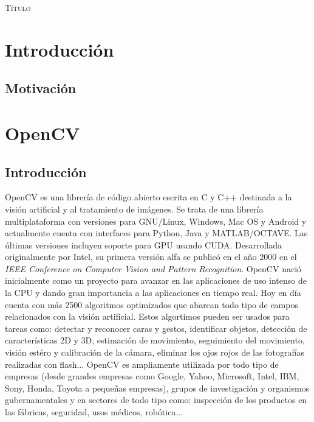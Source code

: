 \documentclass[a4paper,openright, 12pt]{book}
\begin{document}
\begin{titlepage}
\begin{center}
\begin{Huge}
\textsc{Título}
\end{Huge}
\end{center}
\end{titlepage}

\newpage
\mbox{}
\thispagestyle{empty} 


\tableofcontents %
\thispagestyle{empty}


\chapter{Introducción}\label{cap.introduccion}

\section{Motivación}
\chapter{OpenCV}

\section{Introducción}
OpenCV es una librería de código abierto escrita en C y C++ destinada a la visión artificial y al tratamiento de imágenes. Se trata de una librería multiplataforma con versiones para GNU/Linux, Windows, Mac OS y Android y actualmente cuenta con interfaces para Python, Java y MATLAB/OCTAVE. Las últimas versiones incluyen soporte para GPU usando CUDA.
Desarrollada originalmente por Intel, su primera versión alfa se publicó en el año 2000 en el \textit{IEEE Conference on Computer Vision and Pattern Recognition}. OpenCV nació inicialmente como un proyecto para avanzar en las aplicaciones de uso intenso de la CPU y dando gran importancia a las aplicaciones en tiempo real. Hoy en día cuenta con más 2500 algoritmos optimizados que abarcan todo tipo de campos relacionados con la visión artificial.
Estos algortimos pueden ser usados para tareas como: detectar y reconocer caras y gestos, identificar objetos, detección de características 2D y 3D, estimación de movimiento, seguimiento del movimiento, visión estéro y calibración de la cámara, eliminar los ojos rojos de las fotografías realizadas con flash...
\newline
OpenCV es ampliamente utilizada por todo tipo de empresas (desde grandes empresas como Google, Yahoo, Microsoft, Intel, IBM, Sony, Honda, Toyota a pequeñas empresas), grupos de investigación y organismos gubernamentales y en sectores de todo tipo como: inspección de los productos en las fábricas, seguridad, usos médicos, robótica...
\newline
\end{document}
